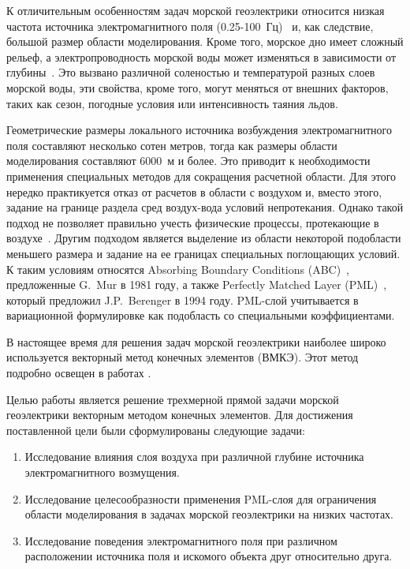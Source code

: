 \documentclass[a4paper,14pt]{article}
\begin{document}
\vspace{-0.7cm}

К отличительным особенностям задач морской геоэлектрики относится низкая частота источника электромагнитного поля (0.25-100~Гц)~\citep{gabrielsen} и, как следствие, большой размер области моделирования. Кроме того, морское дно имеет сложный рельеф, а электропроводность морской воды может изменяться в зависимости от глубины~\citep{shurina}. Это вызвано различной соленостью и температурой разных слоев морской воды, эти свойства, кроме того, могут меняться от внешних факторов, таких как сезон, погодные условия или интенсивность таяния льдов.

Геометрические размеры локального источника возбуждения электромагнитного поля составляют несколько сотен метров, тогда как размеры области моделирования составляют 6000~м и более. Это приводит к необходимости применения специальных методов для сокращения расчетной области. Для этого нередко практикуется отказ от расчетов в области с воздухом и, вместо этого, задание на границе раздела сред воздух-вода условий непротекания. Однако такой подход не позволяет правильно учесть физические процессы, протекающие в воздухе~\citep{anderson}.
Другим подходом является выделение из области некоторой подобласти меньшего размера и задание на ее границах специальных поглощающих условий. К таким условиям относятся Absorbing Boundary Conditions (ABC)~\citep{mur}, предложенные G.~Mur в 1981 году, а также Perfectly Matched Layer (PML)~\citep{berenger, wiik_dehoop_ursin}, который предложил J.P.~Berenger в 1994 году. PML-слой учитывается в вариационной формулировке как подобласть со специальными коэффициентами. 

В настоящее время для решения задач морской геоэлектрики наиболее широко используется векторный метод конечных элементов (ВМКЭ). Этот метод подробно освещен в работах \citep{balandin_vfem, monk}.

Целью работы является решение трехмерной прямой задачи морской геоэлектрики векторным методом конечных элементов. Для достижения поставленной цели были сформулированы следующие задачи:
\begin{enumerate}
	\item Исследование влияния слоя воздуха при различной глубине источника электромагнитного возмущения.
	\item Исследование целесообразности применения PML-слоя для ограничения области моделирования в задачах морской геоэлектрики на низких частотах.
	\item Исследование поведения электромагнитного поля при различном расположении источника поля и искомого объекта друг относительно друга.
\end{enumerate}
\end{document}
